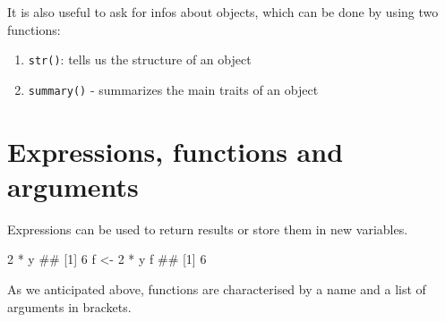 \documentclass[a4paper,12pt,oneside]{book}
\providecommand{\tightlist}{%
  \setlength{\itemsep}{0pt}\setlength{\parskip}{0pt}}
\newenvironment{Shaded}{\begin{snugshade}}{\end{snugshade}}
\newcommand{\DecValTok}[1]{#1}
\newcommand{\SpecialCharTok}[1]{#1}
\newcommand{\DocumentationTok}[1]{#1}
\newcommand{\OtherTok}[1]{#1}
\newcommand{\FunctionTok}[1]{#1}
\newcommand{\NormalTok}[1]{#1}
\begin{document}
It is also useful to ask for infos about objects, which can be done by using two functions:

\begin{enumerate}
\def\labelenumi{\arabic{enumi}.}
\tightlist
\item
  \texttt{str()}: tells us the structure of an object
\item
  \texttt{summary()} - summarizes the main traits of an object
\end{enumerate}

\begin{Shaded}
\end{Shaded}

\hypertarget{expressions-functions-and-arguments}{%
\section{Expressions, functions and arguments}\label{expressions-functions-and-arguments}}

Expressions can be used to return results or store them in new variables.

\begin{Shaded}
\begin{Highlighting}[]
\DecValTok{2} \SpecialCharTok{*}\NormalTok{ y}
\DocumentationTok{\#\# [1] 6}
\NormalTok{f  }\OtherTok{\textless{}{-}}  \DecValTok{2} \SpecialCharTok{*}\NormalTok{ y}
\NormalTok{f}
\DocumentationTok{\#\# [1] 6}
\end{Highlighting}
\end{Shaded}

As we anticipated above, functions are characterised by a name and a list of arguments in brackets.
\end{document}
